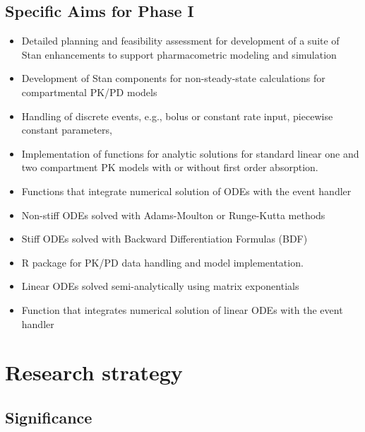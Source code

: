 \documentclass[11pt]{article}
\newcommand{\instructions}[1]{}
\begin{document}
\subsection*{Specific Aims for Phase I}

\begin{itemize}
\item Detailed planning and feasibility assessment for development of
  a suite of Stan enhancements to support pharmacometric modeling and
  simulation
\item Development of Stan components for non-steady-state calculations
  for compartmental PK/PD models
\item Handling of discrete events, e.g., bolus or constant rate input,
  piecewise constant parameters,
\item Implementation of functions for analytic solutions for standard
  linear one and two compartment PK models with or without first order
  absorption.
\item Functions that integrate numerical solution of ODEs with the
  event handler
\item Non-stiff ODEs solved with Adams-Moulton or Runge-Kutta methods
\item Stiff ODEs solved with Backward Differentiation Formulas (BDF)
\item R package for PK/PD data handling and model implementation.
\item Linear ODEs solved semi-analytically using matrix exponentials
\item Function that integrates numerical solution of linear ODEs
  with the event handler
\end{itemize}


\clearpage
\section*{Research strategy}

\instructions{ Organize the Research Strategy in the specified order
    and using the instructions provided below. Start each section with
    the appropriate section heading---Significance, Innovation,
    Approach. Cite published experimental details in the Research
    Strategy section and provide the full reference in the
    Bibliography and References cited section.}

\subsection*{Significance}
\end{document}

